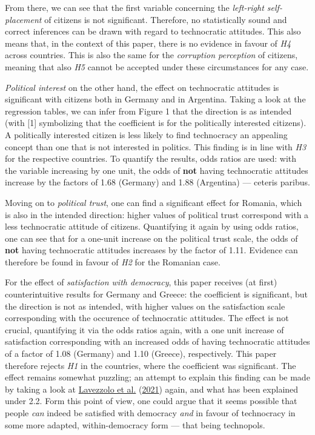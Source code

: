 \documentclass[
  12pt,
  english,
]{article}
\begin{document}
From there, we can see that the first variable concerning the
\emph{left-right self-placement} of citizens is not significant.
Therefore, no statistically sound and correct inferences can be drawn
with regard to technocratic attitudes. This also means that, in the
context of this paper, there is no evidence in favour of \emph{H4}
across countries. This is also the same for the \emph{corruption
perception} of citizens, meaning that also \emph{H5} cannot be accepted
under these circumstances for any case.

\emph{Political interest} on the other hand, the effect on technocratic
attitudes is significant with citizens both in Germany and in Argentina.
Taking a look at the regression tables, we can infer from Figure 1 that
the direction is as intended (with {[}1{]} symbolizing that the
coefficient is for the politically interested citizens). A politically
interested citizen is less likely to find technocracy an appealing
concept than one that is not interested in politics. This finding is in
line with \emph{H3} for the respective countries. To quantify the
results, odds ratios are used: with the variable increasing by one unit,
the odds of \textbf{not} having technocratic attitudes increase by the
factors of 1.68 (Germany) and 1.88 (Argentina) --- ceteris paribus.

Moving on to \emph{political trust}, one can find a significant effect
for Romania, which is also in the intended direction: higher values of
political trust correspond with a less technocratic attitude of
citizens. Quantifying it again by using odds ratios, one can see that
for a one-unit increase on the political trust scale, the odds of
\textbf{not} having technocratic attitudes increases by the factor of
1.11. Evidence can therefore be found in favour of \emph{H2} for the
Romanian case.

For the effect of \emph{satisfaction with democracy}, this paper
receives (at first) counterintuitive results for Germany and Greece: the
coefficient is significant, but the direction is not as intended, with
higher values on the satisfaction scale corresponding with the occurence
of technocratic attitudes. The effect is not crucial, quantifying it via
the odds ratios again, with a one unit increase of satisfaction
corresponding with an increased odds of having technocratic attitudes of
a factor of 1.08 (Germany) and 1.10 (Greece), respectively. This paper
therefore rejects \emph{H1} in the countries, where the coefficient was
significant. The effect remains somewhat puzzling; an attempt to explain
this finding can be made by taking a look at
\protect\hyperlink{ref-lavezzolo2021will}{Lavezzolo et al.}
(\protect\hyperlink{ref-lavezzolo2021will}{2021}) again, and what has
been explained under 2.2. Form this point of view, one could argue that
it seems possible that people \emph{can} indeed be satisfied with
democracy \emph{and} in favour of technocracy in some more adapted,
within-democracy form --- that being technopols.
\end{document}
